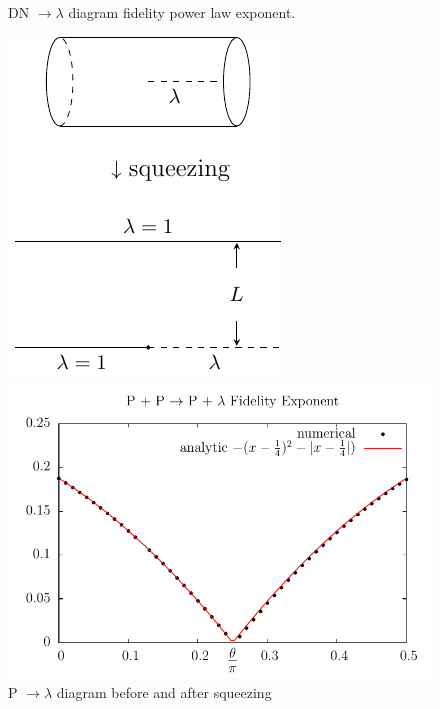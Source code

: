 \documentclass{article}
\begin{document}
\begin{figure}[h]
\begin{minipage}[t]{0.65\linewidth}
\caption{DN $\rightarrow \lambda$ diagram fidelity power law exponent.}
\end{minipage}
\end{figure}

\begin{figure}[!h]
\begin{minipage}[t]{0.3\linewidth}
\centering
\includegraphics[width=\textwidth]{fig_P-squeeze}
\caption{P $\rightarrow \lambda$ diagram before and after squeezing}
\label{fig:P-squeeze}
\end{minipage}
\hfill
\begin{minipage}[t]{0.65\linewidth}
\centering
\includegraphics[width=\textwidth]{p_p2tan.pdf}

\end{minipage}
\end{figure}
\end{document}
